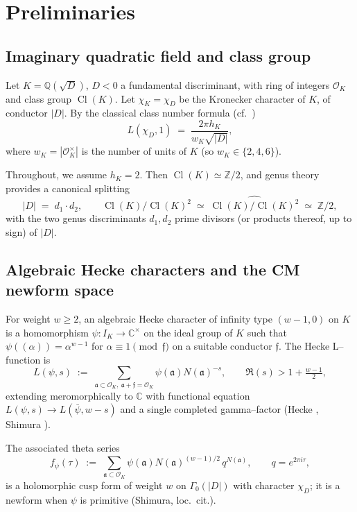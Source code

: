 \documentclass[11pt]{amsart}
\theoremstyle{definition}
\theoremstyle{remark}
\DeclareMathOperator{\Cl}{Cl}
\newcommand{\Q}{\mathbb{Q}}
\newcommand{\Z}{\mathbb{Z}}
\newcommand{\C}{\mathbb{C}}
\newcommand{\OK}{\mathcal{O}_K}
\begin{document}
\section{Preliminaries}\label{sec:prelim}

\subsection{Imaginary quadratic field and class group}\label{ssec:K}
Let \(K = \Q(\sqrt D)\), \(D < 0\) a fundamental discriminant, with
ring of integers \(\OK\) and class group \(\Cl(K)\). Let
\(\chi_K = \chi_D\) be the Kronecker character of \(K\), of conductor
\(|D|\). By the classical class number formula
(cf.\ \cite[Ch.~7]{Cox1989})
\[
   L(\chi_D, 1) \;=\;
   \frac{2 \pi h_K}{w_K \sqrt{|D|}} ,
\]
where \(w_K = |\OK^\times|\) is the number of units of \(K\) (so
\(w_K \in \{2, 4, 6\}\)).

Throughout, we assume \(h_K = 2\). Then \(\Cl(K) \simeq \Z/2\), and
genus theory \cite{Gauss1801,Cox1989} provides a canonical splitting
\[
   |D| \;=\; d_1 \cdot d_2 ,
   \qquad
   \Cl(K)/\Cl(K)^2 \;\simeq\; \widehat{\Cl(K)/\Cl(K)^2}
   \;\simeq\; \Z/2 ,
\]
with the two genus discriminants \(d_1, d_2\) prime divisors (or
products thereof, up to sign) of \(|D|\).

\subsection{Algebraic Hecke characters and the CM newform space}
\label{ssec:hecke-CM}
For weight \(w \ge 2\), an algebraic Hecke character of infinity type
\((w{-}1, 0)\) on \(K\) is a homomorphism \(\psi : I_K \to \C^\times\)
on the ideal group of \(K\) such that
\(\psi((\alpha)) = \alpha^{w-1}\) for \(\alpha \equiv 1 \pmod{\mathfrak f}\)
on a suitable conductor \(\mathfrak f\). The Hecke L--function is
\begin{equation}\label{eq:Hecke-L}
   L(\psi, s) \;:=\;
   \sum_{\mathfrak a \subset \OK,\ \mathfrak a + \mathfrak f = \OK}
   \psi(\mathfrak a) N(\mathfrak a)^{-s} ,
   \qquad \Re(s) > 1 + \tfrac{w - 1}{2} ,
\end{equation}
extending meromorphically to \(\C\) with functional equation
\(L(\psi, s) \to L(\bar\psi, w - s)\) and a single completed
gamma--factor (Hecke \cite{Hecke1936}, Shimura \cite{Shimura1971}).

The associated theta series
\begin{equation}\label{eq:theta-psi}
   f_\psi(\tau)
   \;:=\;
   \sum_{\mathfrak a \subset \OK}
   \psi(\mathfrak a) N(\mathfrak a)^{(w-1)/2}\,
   q^{N(\mathfrak a)} ,
   \qquad q = e^{2\pi i \tau} ,
\end{equation}
is a holomorphic cusp form of weight \(w\) on \(\Gamma_0(|D|)\) with
character \(\chi_D\); it is a newform when \(\psi\) is primitive
(Shimura, loc.\ cit.).
\end{document}
